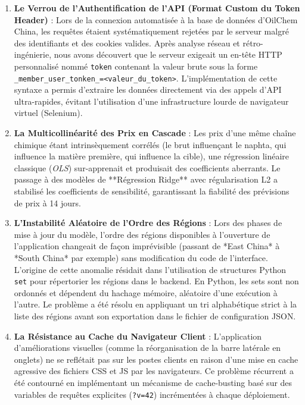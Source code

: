 \documentclass[12pt,a4paper]{article}
\begin{document}
\begin{enumerate}
    \item \textbf{Le Verrou de l'Authentification de l'API (Format Custom du Token Header)} :
    Lors de la connexion automatisée à la base de données d'OilChem China, les requêtes étaient systématiquement rejetées par le serveur malgré des identifiants et des cookies valides. Après analyse réseau et rétro-ingénierie, nous avons découvert que le serveur exigeait un en-tête HTTP personnalisé nommé \texttt{token} contenant la valeur brute sous la forme \texttt{\_member\_user\_tonken\_=<valeur\_du\_token>}. L'implémentation de cette syntaxe a permis d'extraire les données directement via des appels d'API ultra-rapides, évitant l'utilisation d'une infrastructure lourde de navigateur virtuel (Selenium).
    
    \item \textbf{La Multicollinéarité des Prix en Cascade} :
    Les prix d'une même chaîne chimique étant intrinsèquement corrélés (le brut influençant le naphta, qui influence la matière première, qui influence la cible), une régression linéaire classique (\textit{OLS}) sur-apprenait et produisait des coefficients aberrants. Le passage à des modèles de **Régression Ridge** avec régularisation L2 a stabilisé les coefficients de sensibilité, garantissant la fiabilité des prévisions de prix à 14 jours.
    
    \item \textbf{L'Instabilité Aléatoire de l'Ordre des Régions} :
    Lors des phases de mise à jour du modèle, l'ordre des régions disponibles à l'ouverture de l'application changeait de façon imprévisible (passant de *East China* à *South China* par exemple) sans modification du code de l'interface. L'origine de cette anomalie résidait dans l'utilisation de structures Python \texttt{set} pour répertorier les régions dans le backend. En Python, les sets sont non ordonnés et dépendent du hachage mémoire, aléatoire d'une exécution à l'autre. Le problème a été résolu en appliquant un tri alphabétique strict à la liste des régions avant son exportation dans le fichier de configuration JSON.
    
    \item \textbf{La Résistance au Cache du Navigateur Client} :
    L'application d'améliorations visuelles (comme la réorganisation de la barre latérale en onglets) ne se reflétait pas sur les postes clients en raison d'une mise en cache agressive des fichiers CSS et JS par les navigateurs. Ce problème récurrent a été contourné en implémentant un mécanisme de cache-busting basé sur des variables de requêtes explicites (\texttt{?v=42}) incrémentées à chaque déploiement.
\end{enumerate}
\end{document}
